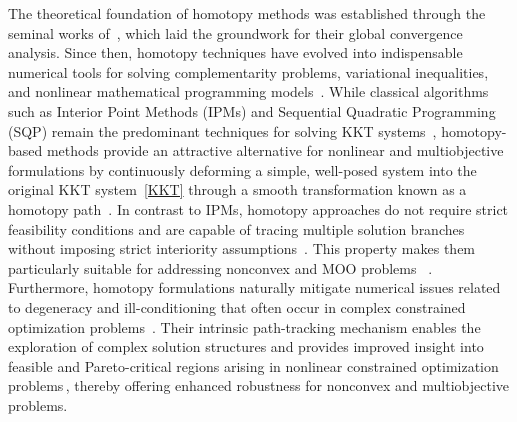 \documentclass[11pt,pdflatex,sn-mathphys-ay]{sn-jnl}%
\theoremstyle{definition}
\theoremstyle{thmstyleone}%
\theoremstyle{thmstyletwo}%
\theoremstyle{thmstylethree}%
\begin{document}
	The theoretical foundation of homotopy methods was established through
	the seminal works of~\cite{kellogg1976,smale1976, chow1978}, which laid
	the groundwork for their global convergence analysis. Since then,
	homotopy techniques have evolved into indispensable numerical tools for
	solving complementarity problems, variational inequalities, and nonlinear
	mathematical programming models~\cite{gowda1996, facchinei2003,
		shang2011, mccormick1989, monteroro1990, lin1997}. While classical
	algorithms such as Interior Point Methods (IPMs) and Sequential Quadratic
	Programming (SQP) remain the predominant techniques for solving KKT
	systems~\cite{nocedal2006numerical}, homotopy-based methods provide an
	attractive alternative for nonlinear and multiobjective formulations by
	continuously deforming a simple, well-posed system into the original KKT
	system~\eqref{KKT} through a smooth transformation known as a homotopy
	path~\cite{allgower1990numerical, watson2002applied}. In contrast to
	IPMs, homotopy approaches do not require strict feasibility conditions
	and are capable of tracing multiple solution branches
	~\cite{mehta2016numerical,nocedal2006numerical} without imposing strict
	interiority assumptions~\cite{mehta2016numerical,
		hauenstein2012polynomial}. This property makes them particularly suitable
	for addressing nonconvex and MOO problems
	~\cite{hauenstein2012polynomial, kruger2019continuation}. Furthermore,
	homotopy formulations naturally mitigate numerical issues related to
	degeneracy and ill-conditioning that often occur in complex constrained
	optimization problems~\cite{allgower2003introduction}.
	Their intrinsic path-tracking mechanism enables the exploration of
	complex solution structures and provides improved insight into feasible
	and Pareto-critical regions arising in nonlinear constrained optimization
	problems\,\cite{hauenstein2012polynomial, allgower1990numerical}, thereby
	offering enhanced robustness for nonconvex and multiobjective problems.
	
\end{document}
